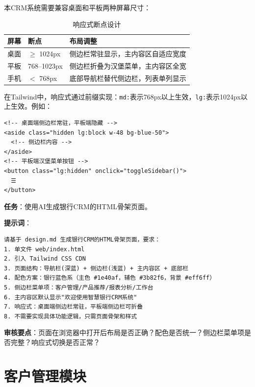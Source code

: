 本CRM系统需要兼容桌面和平板两种屏幕尺寸：

\begin{table}[H]
\centering
\begin{tabular}{lll}
\toprule
\textbf{屏幕} & \textbf{断点} & \textbf{布局调整} \\
\midrule
桌面 & $\geq$ 1024px & 侧边栏常驻显示，主内容区自适应宽度 \\
平板 & 768--1023px & 侧边栏折叠为汉堡菜单，主内容区全宽 \\
手机 & $<$ 768px & 底部导航栏替代侧边栏，列表单列显示 \\
\bottomrule
\end{tabular}
\caption{响应式断点设计}
\end{table}

在Tailwind中，响应式通过前缀实现：\texttt{md:}表示768px以上生效，\texttt{lg:}表示1024px以上生效。例如：

\begin{lstlisting}[style=html]
<!-- 桌面端侧边栏常驻，平板端隐藏 -->
<aside class="hidden lg:block w-48 bg-blue-50">
  <!-- 侧边栏内容 -->
</aside>
<!-- 平板端汉堡菜单按钮 -->
<button class="lg:hidden" onclick="toggleSidebar()">
  ☰
</button>
\end{lstlisting}

\begin{practicebox}[用AI设计CRM界面]
\textbf{任务}：使用AI生成银行CRM的HTML骨架页面。

\textbf{提示词}：

\begin{lstlisting}
请基于 design.md 生成银行CRM的HTML骨架页面，要求：
1. 单文件 web/index.html
2. 引入 Tailwind CSS CDN
3. 页面结构：导航栏(深蓝) + 侧边栏(浅蓝) + 主内容区 + 底部栏
4. 配色方案：银行蓝色系（主色 #1e40af，辅色 #3b82f6，背景 #eff6ff）
5. 侧边栏菜单项：客户管理/产品推荐/报表分析/工作台
6. 主内容区默认显示"欢迎使用智慧银行CRM系统"
7. 响应式：桌面端侧边栏常驻，平板端侧边栏可折叠
8. 不需要实现具体功能逻辑，只需页面骨架和样式
\end{lstlisting}

\textbf{审核要点}：页面在浏览器中打开后布局是否正确？配色是否统一？侧边栏菜单项是否完整？响应式切换是否正常？
\end{practicebox}

\section{客户管理模块}

